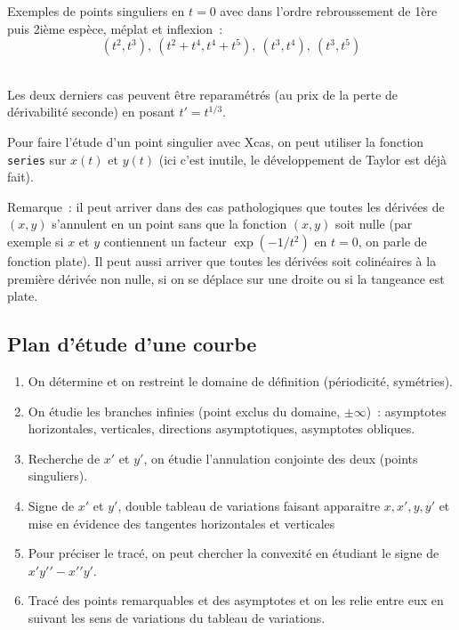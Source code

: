 \documentclass[a4paper,11pt]{article}
\begin{document}
\begin{giacjshere}
Exemples de points singuliers en $t=0$ avec dans l'ordre rebroussement
de 1\`ere puis 2i\`eme esp\`ece, m\'eplat et inflexion~: 
$$ (t^2,t^3), \ (t^2+t^4,t^4+t^5), \ (t^3,t^4), \ (t^3,t^5) $$\\

Les deux derniers cas peuvent \^etre reparam\'etr\'es (au prix
de la perte de d\'erivabilit\'e seconde) en posant $t'=t^{1/3}$.

Pour faire l'\'etude d'un point singulier avec Xcas, on peut utiliser
la fonction \verb|series| sur $x(t)$ et $y(t)$ (ici c'est inutile,
le d\'eveloppement de Taylor est d\'ej\`a fait).

Remarque~: il peut arriver dans des cas pathologiques
que toutes les d\'eriv\'ees de $(x,y)$ s'annulent en
un point sans que la fonction $(x,y)$ soit nulle (par exemple si $x$
et $y$ contiennent un facteur $\exp(-1/t^2)$ en $t=0$, on parle
de fonction plate). Il peut aussi
arriver que toutes les d\'eriv\'ees soit colin\'eaires \`a la
premi\`ere d\'eriv\'ee non nulle, si on se d\'eplace sur une droite
ou si la tangeance est plate.

\subsection{Plan d'\'etude d'une courbe}
\begin{enumerate}
\item On d\'etermine et on restreint le domaine de d\'efinition
(p\'eriodicit\'e, sym\'etries). 
\item On \'etudie les branches infinies (point exclus du domaine,
$\pm \infty$)~: asymptotes horizontales, verticales, directions
asymptotiques, asymptotes obliques.
\item Recherche de $x'$ et $y'$, on \'etudie l'annulation conjointe
  des deux (points singuliers).
\item Signe de $x'$ et $y'$, double tableau de variations faisant
apparaitre $x,x',y,y'$ et mise
en \'evidence des tangentes horizontales et verticales
\item Pour pr\'eciser le trac\'e, on peut chercher la convexit\'e
en \'etudiant le signe de $x'y'{'}-x'{'}y'$.
\item Trac\'e des points remarquables et des asymptotes et
on les relie entre eux en suivant les sens de variations
du tableau de variations.
\end{enumerate}


\end{giacjshere}
\end{document}
